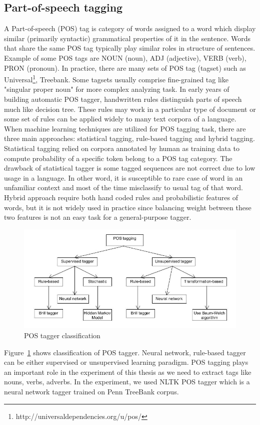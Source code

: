 \subsection{Part-of-speech tagging}
A Part-of-speech (POS) tag is category of words assigned to a word which display similar (primarily syntactic) grammatical properties of it in the sentence. Words that share the same POS tag 
typically play similar roles in structure of sentences. Example of some POS tags are NOUN (noun), ADJ (adjective), VERB (verb), PRON (pronoun). In practice, there are many sets of POS tag (tagset) such as Universal\footnote{http://universaldependencies.org/u/pos/}, Treebank. Some tagsets usually comprise fine-grained tag like "singular proper noun" for more complex analyzing task. In early years of building automatic POS tagger, handwritten rules distinguish parts of speech much like decision tree. These rules may work in a particular type of document or some set of rules can be applied widely to many text corpora of a language.\\
When machine learning techniques are utilized for POS tagging task, there are three main approaches: statistical tagging, rule-based tagging and hybrid tagging. Statistical tagging relied on corpora annotated by human as training data to compute probability of a specific token belong to a POS tag category. The drawback of statistical tagger is some tagged sequences are not correct due to low usage in a language. In other word, it is susceptible to rare case of word in an unfamiliar context and most of the time misclassify to usual tag of that word. Hybrid approach require both hand coded rules and probabilistic features of words, but it is not widely used in practice since balancing weight between these two features is not an easy task for a general-purpose tagger.\\
\begin{figure}
\centering
\includegraphics[width=\textwidth, clip=true]{img/POS_tagger}
\caption[POS tagger classification]{POS tagger classification} 
\label{fig:pos_tag}
\end{figure}
Figure~\ref{fig:pos_tag} shows classification of POS tagger. Neural network, rule-based tagger can be either supervised or unsupervised learning paradigm. POS tagging plays an important role in the experiment of this thesis as we need to extract tags like nouns, verbs, adverbs. In the experiment, we used NLTK POS tagger which is a neural network tagger trained on Penn TreeBank corpus.
